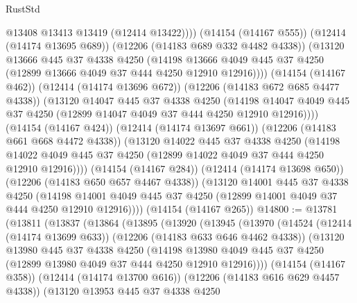 \begin{lexlean}{RustStd}
\begin{coremodule}
                  @13408
                  @13413
                  @13419
                  (@12414 @13422))))
            (@14154 (@14167 @555))
            (@12414 (@14174 @13695 @689))
            (@12206 (@14183 @689 @332 @4482 @4338))
            (@13120
              @13666
              @445
              @37
              @4338
              @4250
              (@14198
                @13666
                @4049
                @445
                @37
                @4250
                (@12899 @13666 @4049 @37 @444 @4250 @12910 @12916))))
          (@14154 (@14167 @462))
          (@12414 (@14174 @13696 @672))
          (@12206 (@14183 @672 @685 @4477 @4338))
          (@13120
            @14047
            @445
            @37
            @4338
            @4250
            (@14198
              @14047
              @4049
              @445
              @37
              @4250
              (@12899 @14047 @4049 @37 @444 @4250 @12910 @12916))))
        (@14154 (@14167 @424))
        (@12414 (@14174 @13697 @661))
        (@12206 (@14183 @661 @668 @4472 @4338))
        (@13120
          @14022
          @445
          @37
          @4338
          @4250
          (@14198 @14022 @4049 @445 @37 @4250 (@12899 @14022 @4049 @37 @444 @4250 @12910 @12916))))
      (@14154 (@14167 @284))
      (@12414 (@14174 @13698 @650))
      (@12206 (@14183 @650 @657 @4467 @4338))
      (@13120
        @14001
        @445
        @37
        @4338
        @4250
        (@14198 @14001 @4049 @445 @37 @4250 (@12899 @14001 @4049 @37 @444 @4250 @12910 @12916))))
    (@14154 (@14167 @265))
@14800 := @13781
    (@13811
      (@13837
        (@13864
          (@13895
            (@13920
              (@13945
                (@13970
                  (@14524
                    (@12414 (@14174 @13699 @633))
                    (@12206 (@14183 @633 @646 @4462 @4338))
                    (@13120
                      @13980
                      @445
                      @37
                      @4338
                      @4250
                      (@14198
                        @13980
                        @4049
                        @445
                        @37
                        @4250
                        (@12899 @13980 @4049 @37 @444 @4250 @12910 @12916))))
                  (@14154 (@14167 @358))
                  (@12414 (@14174 @13700 @616))
                  (@12206 (@14183 @616 @629 @4457 @4338))
                  (@13120
                    @13953
                    @445
                    @37
                    @4338
                    @4250

\end{coremodule}
\end{lexlean}
